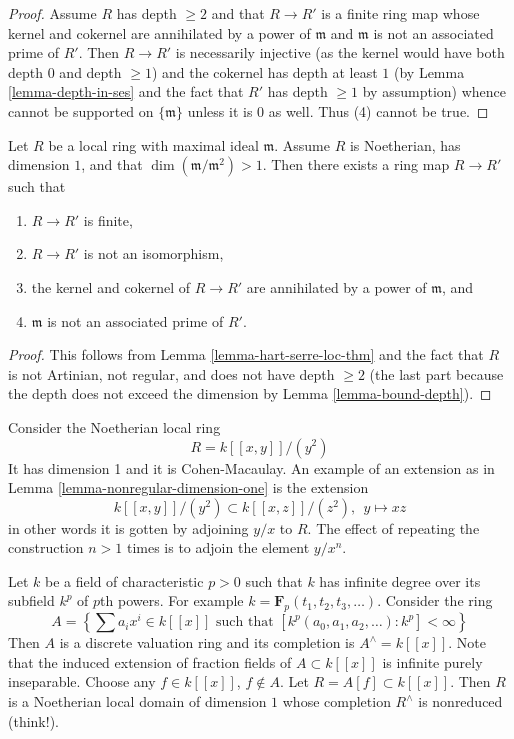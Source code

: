 \begin{proof}
\medskip\noindent
Assume $R$ has depth $\geq 2$ and that $R \to R'$ is a finite
ring map whose kernel and cokernel are annihilated by a power
of $\mathfrak m$ and $\mathfrak m$ is not an associated prime of $R'$.
Then $R \to R'$ is necessarily injective (as the kernel would have
both depth $0$ and depth $\geq 1$) and the cokernel has depth
at least $1$ (by Lemma \ref{lemma-depth-in-ses}
and the fact that $R'$ has depth $\geq 1$ by assumption)
whence cannot be supported on
$\{\mathfrak m\}$ unless it is $0$ as well. Thus (4) cannot be true.
\end{proof}

\begin{lemma}
\label{lemma-nonregular-dimension-one}
Let $R$ be a local ring with maximal ideal $\mathfrak m$.
Assume $R$ is Noetherian, has dimension $1$, and that
$\dim(\mathfrak m/\mathfrak m^2) > 1$. Then there exists
a ring map $R \to R'$ such that
\begin{enumerate}
\item $R \to R'$ is finite,
\item $R \to R'$ is not an isomorphism,
\item the kernel and cokernel of $R \to R'$ are annihilated by
a power of $\mathfrak m$, and
\item $\mathfrak m$ is not an associated prime of $R'$.
\end{enumerate}
\end{lemma}

\begin{proof}
This follows from Lemma \ref{lemma-hart-serre-loc-thm}
and the fact that $R$ is not Artinian, not regular, and
does not have depth $\geq 2$ (the last part because the
depth does not exceed the dimension by
Lemma \ref{lemma-bound-depth}).
\end{proof}

\begin{example}
\label{example-nonreduced}
Consider the Noetherian local ring
$$
R = k[[x, y]]/(y^2)
$$
It has dimension 1 and it is Cohen-Macaulay.
An example of an extension as in
Lemma \ref{lemma-nonregular-dimension-one}
is the extension
$$
k[[x, y]]/(y^2) \subset k[[x, z]]/(z^2), \ \ y \mapsto xz
$$
in other words it is gotten by adjoining $y/x$ to $R$. The
effect of repeating the construction $n > 1$ times is
to adjoin the element $y/x^n$.
\end{example}

\begin{example}
\label{example-bad-dvr-char-p}
Let $k$ be a field of characteristic $p > 0$ such that $k$
has infinite degree over its subfield $k^p$ of $p$th powers.
For example $k = \mathbf{F}_p(t_1, t_2, t_3, \ldots)$.
Consider the ring
$$
A =
\left\{
\sum a_i x^i \in k[[x]] \text{ such that }
[k^p(a_0, a_1, a_2, \ldots) : k^p] < \infty
\right\}
$$
Then $A$ is a discrete valuation ring and its completion is
$A^\wedge = k[[x]]$. Note that the induced extension of fraction
fields of $A \subset k[[x]]$ is infinite purely inseparable.
Choose any $f \in k[[x]]$, $f \not \in A$. Let $R = A[f] \subset k[[x]]$.
Then $R$ is a Noetherian local domain of dimension $1$ whose
completion $R^\wedge$ is nonreduced (think!).
\end{example}

